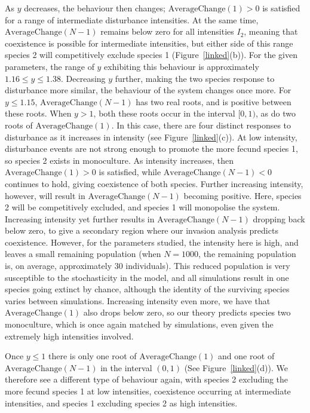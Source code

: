 As $y$ decreases, the behaviour then changes; $\text{AverageChange}(1)>0$ is satisfied for a range of intermediate disturbance intensities. At the same time, $\text{AverageChange}(N-1)$ remains below zero for all intensities $I_2$, meaning that coexistence is possible for intermediate intensities, but either side of this range species 2 will competitively exclude species 1 (Figure~\ref{linked}(b)). For the given parameters, the range of $y$ exhibiting this behaviour is approximately $1.16 \leq y \leq 1.38$. Decreasing $y$ further, making the two species response to disturbance more similar, the behaviour of the system changes once more. For $y\leq 1.15$, $\text{AverageChange}(N-1)$ has two real roots, and is positive between these roots. When $y>1$, both these roots occur in the interval $[0,1)$, as do two roots of $\text{AverageChange}(1)$. In this case, there are four distinct responses to disturbance as it increases in intensity (see Figure~\ref{linked}(c)). At low intensity, disturbance events are not strong enough to promote the more fecund species 1, so species 2 exists in monoculture. As intensity increases, then $\text{AverageChange}(1)>0$ is satisfied, while $\text{AverageChange}(N-1)<0$ continues to hold, giving coexistence of both species. Further increasing intensity, however, will result in $\text{AverageChange}(N-1)$ becoming positive. Here, species 2 will be competitively excluded, and species 1 will monopolise the system. Increasing intensity yet further results in $\text{AverageChange}(N-1)$ dropping back below zero, to give a secondary region where our invasion analysis predicts coexistence. However, for the parameters studied, the intensity here is high, and leaves a small remaining population (when $N=1000$, the remaining population is, on average, approximately 30 individuals). This reduced population is very susceptible to the stochasticity in the model, and all simulations result in one species going extinct by chance, although the identity of the surviving species varies between simulations. Increasing intensity even more, we have that $\text{AverageChange}(1)$ also drops below zero, so our theory predicts species two monoculture, which is once again matched by simulations, even given the extremely high intensities involved.

Once $y\leq 1$ there is only one root of $\text{AverageChange}(1)$ and one root of $\text{AverageChange}(N-1)$ in the interval $(0,1)$ (See Figure~\ref{linked}(d)). We therefore see a different type of behaviour again, with species 2 excluding the more fecund species 1 at low intensities, coexistence occurring at intermediate intensities, and species 1 excluding species 2 as high intensities.

